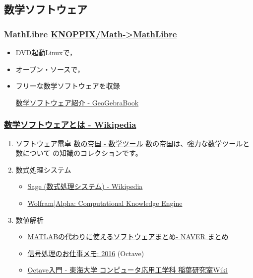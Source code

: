 \documentclass[dvipdfmx,11pat]{jarticle}
\begin{document}
\subsection{数学ソフトウェア}
\label{sec:orgc25e67e}
\subsubsection{MathLibre  \href{https://www.geogebra.org/m/hShSTr6e}{KNOPPIX/Math->MathLibre}}
\label{sec:org4133cf6}
\begin{itemize}
\item DVD起動Linuxで，
\item オープン・ソースで，
\item フリーな数学ソフトウェアを収録 

\href{https://www.geogebra.org/m/hShSTr6e}{数学ソフトウェア紹介 - GeoGebraBook}
\end{itemize}
\subsubsection{\href{https://ja.wikipedia.org/wiki/\%E6\%95\%B0\%E5\%AD\%A6\%E3\%82\%BD\%E3\%83\%95\%E3\%83\%88\%E3\%82\%A6\%E3\%82\%A7\%E3\%82\%A2}{数学ソフトウェアとは - Wikipedia}}
\label{sec:orge64042d}
\begin{enumerate}
\item ソフトウェア電卓  
\href{http://ja.numberempire.com/}{数の帝国 - 数学ツール} 数の帝国は、強力な数学ツールと数について
の知識のコレクションです。
\item 数式処理システム
\begin{itemize}
\item \href{https://ja.wikipedia.org/wiki/Sage\_(\%E6\%95\%B0\%E5\%BC\%8F\%E5\%87\%A6\%E7\%90\%86\%E3\%82\%B7\%E3\%82\%B9\%E3\%83\%86\%E3\%83\%A0)}{Sage (数式処理システム) - Wikipedia}
\item \href{http://www.wolframalpha.com/}{Wolfram|Alpha: Computational Knowledge Engine}
\end{itemize}
\item 数値解析
\begin{itemize}
\item \href{https://matome.naver.jp/odai/2136163231573327601}{MATLABの代わりに使えるソフトウェアまとめ- NAVER まとめ}
\item \href{http://signalprocessor.blogspot.jp/2016/}{信号処理のお仕事メモ: 2016} (Octave)
\item \href{http://www.inaba-lab.org/wiki/index.php/Octave\%E5\%85\%A5\%E9\%96\%80}{Octave入門 - 東海大学 コンピュータ応用工学科 稲葉研究室Wiki}
\end{itemize}
\end{enumerate}
\end{document}
